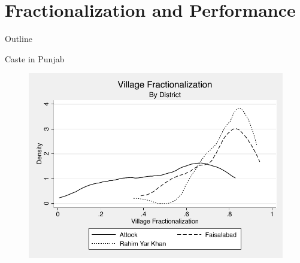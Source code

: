 \documentclass{beamer}
\begin{document}
\section{Fractionalization and Performance}\label{}
\begin{frame}{Outline}
	\tableofcontents[currentsection]
\end{frame}

	
\begin{frame}{Caste in Punjab}
	\begin{figure}[htb]
		\begin{center}
		\includegraphics[scale=0.6]{graphs/village_frac_by_district.pdf}
		\end{center}
	\end{figure}		
\end{frame}
\end{document}

